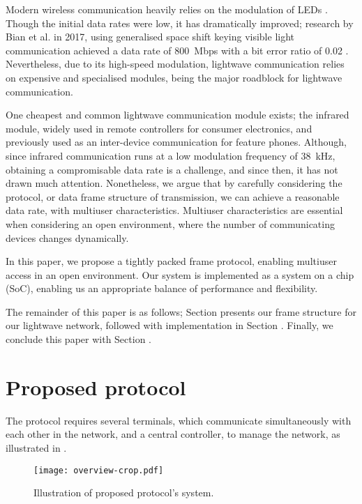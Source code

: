﻿\documentclass[twocolumn,9pt]{ltjsarticle}
\renewcommand{\ref}{\Cref}
\begin{document}
Modern wireless communication heavily relies on the modulation of LEDs \cite{nakagawa2004}.
Though the initial data rates were low, it has dramatically improved;
research by Bian et al. in 2017, using generalised space shift keying visible light communication achieved a data rate of \SI{800}{Mbps} with a bit error ratio of 0.02 \cite{Bian2017}.
Nevertheless, due to its high-speed modulation, lightwave communication relies on expensive and specialised modules, being the major roadblock for lightwave communication.

One cheapest and common lightwave communication module exists; the infrared module, widely used in remote controllers for consumer electronics, and previously used as an inter-device communication for feature phones.
Although, since infrared communication runs at a low modulation frequency of \SI{38}{kHz}, obtaining a compromisable data rate is a challenge, and since then, it has not drawn much attention.
Nonetheless, we argue that by carefully considering the protocol, or data frame structure of transmission, we can achieve a reasonable data rate, with multiuser characteristics.
Multiuser characteristics are essential when considering an open environment, where the number of communicating devices changes dynamically.

In this paper, we propose a tightly packed frame protocol, enabling multiuser access in an open environment.
Our system is implemented as a system on a chip (SoC), enabling us an appropriate balance of performance and flexibility.

The remainder of this paper is as follows;
Section \ref{sec:prp} presents our frame structure for our lightwave network, followed with implementation in Section \ref{sec:impl}.
Finally, we conclude this paper with Section \ref{sec:cncl}.

\section{Proposed protocol}
The protocol requires several terminals, which communicate simultaneously with each other in the network, and a central controller, to manage the network, as illustrated in \ref{fig:overview}.

\begin{figure}[tb]
  \centering
  \texttt{[image: overview-crop.pdf]}
  \caption{\label{fig:overview}
    Illustration of proposed protocol's system.
  }
\end{figure}
\end{document}
